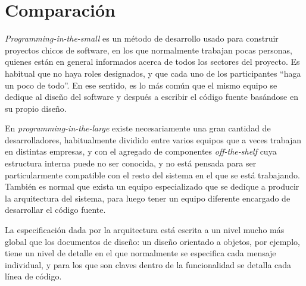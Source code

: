 
\section{Comparación}


\textit{Programming-in-the-small} es un método de desarrollo usado para construir proyectos chicos de software, en los que normalmente trabajan pocas personas, quienes están en general informados acerca de todos los sectores del proyecto. Es habitual que no haya roles designados, y que cada uno de los participantes ``haga un poco de todo''. En ese sentido, es lo más común que el mismo equipo se dedique al diseño del software y después a escribir el código fuente basándose en su propio diseño.

En \textit{programming-in-the-large} existe necesariamente una gran cantidad de desarrolladores, habitualmente dividido entre varios equipos que a veces trabajan en distintas empresas, y con el agregado de componentes \textit{off-the-shelf} cuya estructura interna puede no ser conocida, y no está pensada para ser particularmente compatible con el resto del sistema  en el que se está trabajando. También es normal que exista un equipo especializado que se dedique a producir la arquitectura del sistema, para luego tener un equipo diferente encargado de desarrollar el código fuente. 

La especificación dada por la arquitectura está escrita a un nivel mucho más global que los documentos de diseño: un diseño orientado a objetos, por ejemplo, tiene un nivel de detalle en el que normalmente se especifica cada mensaje individual, y para los que son claves dentro de la funcionalidad se detalla cada línea de código.

